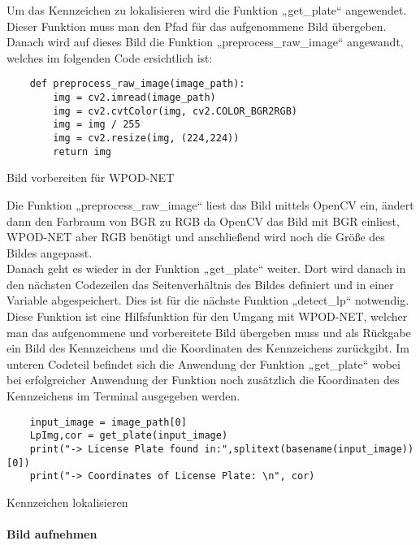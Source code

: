 Um das Kennzeichen zu lokalisieren wird die Funktion „get{\_}plate“ angewendet. Dieser Funktion muss man den Pfad für das aufgenommene 
Bild übergeben. Danach wird auf dieses Bild die Funktion „preprocess{\_}raw{\_}image“ angewandt, welches im folgenden Code ersichtlich ist:

\begin{listing}[H]
    \begin{verbatim}
    def preprocess_raw_image(image_path):
        img = cv2.imread(image_path)
        img = cv2.cvtColor(img, cv2.COLOR_BGR2RGB)
        img = img / 255
        img = cv2.resize(img, (224,224))
        return img
    \end{verbatim}
    \caption{Bild vorbereiten für WPOD-NET}
\end{listing}

Die Funktion „preprocess{\_}raw{\_}image“ liest das Bild mittels OpenCV ein, ändert dann den Farbraum von BGR zu RGB da OpenCV das Bild mit 
BGR einliest, WPOD-NET aber RGB benötigt und anschließend wird noch die Größe des Bildes angepasst.\\

Danach geht es wieder in der Funktion „get{\_}plate“ weiter. Dort wird danach in den nächsten Codezeilen das Seitenverhältnis des Bildes 
definiert und in einer Variable abgespeichert. Dies ist für die nächste Funktion „detect{\_}lp“ notwendig. Diese Funktion ist eine Hilfsfunktion 
für den Umgang mit WPOD-NET, welcher man das aufgenommene und vorbereitete Bild übergeben muss und als Rückgabe ein Bild des Kennzeichens und 
die Koordinaten des Kennzeichens zurückgibt. Im unteren Codeteil befindet sich die Anwendung der Funktion „get{\_}plate“ wobei bei erfolgreicher 
Anwendung der Funktion noch zusätzlich die Koordinaten des Kennzeichens im Terminal ausgegeben werden.

\begin{listing}[H]
    \begin{verbatim}
    input_image = image_path[0]
    LpImg,cor = get_plate(input_image)
    print("-> License Plate found in:",splitext(basename(input_image))[0])
    print("-> Coordinates of License Plate: \n", cor)
    \end{verbatim}
    \caption{Kennzeichen lokalisieren}
\end{listing}

\paragraph{Bild aufnehmen}\mbox{}\\


